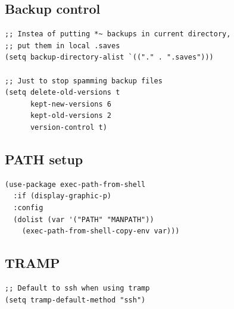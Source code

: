\documentclass[10pt]{article}
\begin{document}
\subsection{Backup control}
\label{sec:orgc08afe5}
\begin{verbatim}
;; Instea of putting *~ backups in current directory,
;; put them in local .saves
(setq backup-directory-alist `(("." . ".saves")))

;; Just to stop spamming backup files
(setq delete-old-versions t
      kept-new-versions 6
      kept-old-versions 2
      version-control t)
\end{verbatim}
\subsection{PATH setup}
\label{sec:orgbcbe422}
\begin{verbatim}
(use-package exec-path-from-shell
  :if (display-graphic-p)
  :config
  (dolist (var '("PATH" "MANPATH"))
    (exec-path-from-shell-copy-env var)))
\end{verbatim}
\subsection{TRAMP}
\label{sec:org98c28d9}
\begin{verbatim}
;; Default to ssh when using tramp
(setq tramp-default-method "ssh")
\end{verbatim}
\end{document}
